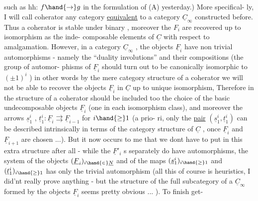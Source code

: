 
\hand{(}such as hh: $f\hand{\to} g$ in the formulation of (A) yesterday.) More specifical-%
ly, I will call coherator any category \uline{equivalent} to a category $\underline{C}_{\infty}$  
constructed before.  Thus a coherator is stable under binary 
, moreover the $F_i$ are recovered up to isomorphism as the inde-%
composable elements of $\underline{C}$ with respect to amalgamation. However, in a
category $\underline{C}_{\infty}$ , the objects $\underline{F}_i$ have non trivial automorphisms - namely
\hand{(}the ``duality involutions'' and their compositions (the group of automor-%
phisms of $\underline{F}_i$ should turn out to be canonically isomorphic to $(\pm 1)^i$ ) in
 other words by the mere category structure of a coherator we
will not be able to recover the objects $\underline{F}_i$ in $\underline{C}$ up to unique isomorphism,
Therefore in the structure of a coherator should be included too the
choice of the basic undecomposable objects $\underline{F}_i$ (one in each isomorphism
class), and moreover the arrows $\underline{s}^i_1$ , $\underline{t}^i_1 : \underline{F}_i \rightrightarrows \underline{F}_{i-1}$ for $i\hand{\geq} 1$ (a prio-%
ri, only the \uline{pair} $(\underline{s}^i_1 , \underline{t}^i_1)$ can be described intrinsically in terms
of the category structure of $\underline{C}$ , once $\underline{F}_i$ and $\underline{F}_{i+1}$ are chosen ...). But
it now occurs to me that we dont have to put in this extra structure after
all - while the $\underline{F}'_i$ s separately do have automorphisms, the system
of the objects $(\underline{F}_i)_{i\hand{\in}\underline{N}}$ and of the maps $(\underline{s}^i_1)_{i\hand{\geq} 1}$ and $(\underline{t}^i_1)_{i\hand{\geq} 1}$ has only
the trivial automorphism (all this of course is heuristics, I did'nt
really prove anything - but the structure of the full subcategory of a
$\underline{C}_{\infty}$ formed by the objects $\underline{F}_i$ seems pretty obvious ... ). To finish get-%
